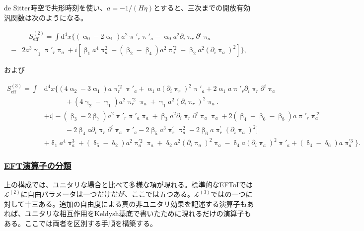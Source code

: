 \documentclass[a4paper,11pt]{ltjsarticle}
\numberwithin{equation}{section}
\newcommand{\subsubsectionlink}[1]{\subsubsection[#1]{\hyperlink{toc}{#1}}}
\newcommand{\dd}{\mathrm{d}}
\begin{document}
de Sitter時空で共形時刻を使い、$a=-1/(H\eta)$とすると、三次までの開放有効汎関数は次のようになる。

\begin{align}
&\quad S_{\mathrm{eff}}^{(2)} = \int \dd^4 x \Big\{\left( \upalpha_0 -2 \upalpha_1\right) a^2 \uppi'_{r} \uppi'_{a} - \upalpha_0 a^2 \partial_i \uppi_{r}  \partial^i \uppi_{a}   \\
-& 2 a^3 \upgamma_1 \uppi'_{r} \uppi_a + i \left[\upbeta_1 a^4 \uppi_a^2 - \left(\upbeta_2 - \upbeta_4\right) a^2\uppi_a^{\prime2} + \upbeta_2 a^2 \left(\partial_i \uppi_{a} \right)^2\right] \Big\}, \nonumber
\end{align}

および

\begin{align}
S_{\mathrm{eff}}^{(3)} =  \int &\dd^4 x \Big\{\left(4 \upalpha_2 -3\upalpha_1 \right) a \uppi_r^{\prime2} \uppi'_{a} + \upalpha_1 a \left(\partial_i \uppi_{r} \right)^2 \uppi'_a + 2 \upalpha_1 a \uppi'_{r}	\partial_i \uppi_{r}  \partial^i \uppi_{a} \\
& \qquad \quad + \left(4 \upgamma_2 -\upgamma_1 \right)  a^2\uppi_r^{\prime2} \uppi_{a}	+ \upgamma_1 a^2	\left(\partial_i \uppi_{r} \right)^2 \uppi_a \nonumber \Big. \\
&+ i \Big[-(\upbeta_3-2\upbeta_7) a^2 \uppi'_{r} \uppi'_{a} \uppi_a + \upbeta_3 a^2 \partial_i \uppi_{r}  \partial^i \uppi_{a} \uppi_a +2 (\upbeta_4+\upbeta_6 - \upbeta_8) a \uppi'_{r} \uppi_a^{\prime2} \nonumber \\
& \qquad \quad - 2 \upbeta_4  a \partial_i \uppi_{r}  \partial^i \uppi_{a} \uppi'_{a} - 2\upbeta_5 a^3 \uppi_r^{\prime} \uppi_a^2  - 2 \upbeta_6 a \uppi_r^{\prime} (\partial_i\uppi_a)^2 \Big] \nonumber\\
&+\updelta_1 a^4 \uppi_a^3 + (\updelta_5- \updelta_2) a^2 \uppi_a^{\prime2} \uppi_a  + \updelta_2 a^2 (\partial_i \uppi_{a})^2 \uppi_a - \updelta_4 a  (\partial_i \uppi_{a})^2 \uppi'_a + (\updelta_4-\updelta_6) a \uppi_a^{\prime3} \Big\}. \nonumber
\end{align}

\subsubsectionlink{EFT演算子の分類}\label{subsubsec:unit}

上の構成では、ユニタリな場合と比べて多様な項が現れる。標準的なEFToI\cite{Cheung:2007st}では$\mathcal{L}^{(2)}$に自由パラメータは一つだけだが、ここでは五つある。$\mathcal{L}^{(3)}$では\cite{Cheung:2007st}の一つに対して十三ある。追加の自由度による真の非ユニタリ効果を記述する演算子もあれば、ユニタリな相互作用をKeldysh基底で書いたために現れるだけの演算子もある。ここでは両者を区別する手順を構築する。
\end{document}
